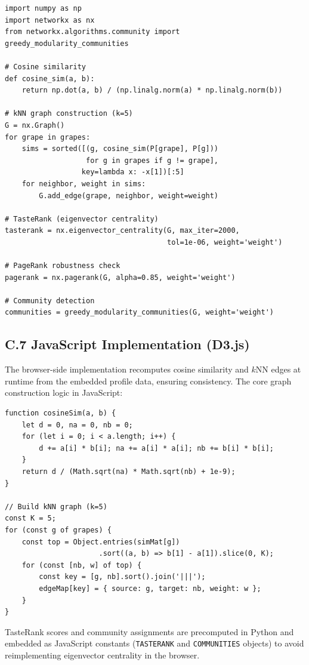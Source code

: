 \documentclass[11pt]{article}
\begin{document}
\begin{verbatim}
import numpy as np
import networkx as nx
from networkx.algorithms.community import greedy_modularity_communities

# Cosine similarity
def cosine_sim(a, b):
    return np.dot(a, b) / (np.linalg.norm(a) * np.linalg.norm(b))

# kNN graph construction (k=5)
G = nx.Graph()
for grape in grapes:
    sims = sorted([(g, cosine_sim(P[grape], P[g]))
                   for g in grapes if g != grape],
                  key=lambda x: -x[1])[:5]
    for neighbor, weight in sims:
        G.add_edge(grape, neighbor, weight=weight)

# TasteRank (eigenvector centrality)
tasterank = nx.eigenvector_centrality(G, max_iter=2000,
                                      tol=1e-06, weight='weight')

# PageRank robustness check
pagerank = nx.pagerank(G, alpha=0.85, weight='weight')

# Community detection
communities = greedy_modularity_communities(G, weight='weight')
\end{verbatim}

\subsection*{C.7 JavaScript Implementation (D3.js)}
The browser-side implementation recomputes cosine similarity and $k$NN edges at runtime from the embedded profile data, ensuring consistency. The core graph construction logic in JavaScript:

\begin{verbatim}
function cosineSim(a, b) {
    let d = 0, na = 0, nb = 0;
    for (let i = 0; i < a.length; i++) {
        d += a[i] * b[i]; na += a[i] * a[i]; nb += b[i] * b[i];
    }
    return d / (Math.sqrt(na) * Math.sqrt(nb) + 1e-9);
}

// Build kNN graph (k=5)
const K = 5;
for (const g of grapes) {
    const top = Object.entries(simMat[g])
                      .sort((a, b) => b[1] - a[1]).slice(0, K);
    for (const [nb, w] of top) {
        const key = [g, nb].sort().join('|||');
        edgeMap[key] = { source: g, target: nb, weight: w };
    }
}
\end{verbatim}

TasteRank scores and community assignments are precomputed in Python and embedded as JavaScript constants (\texttt{TASTERANK} and \texttt{COMMUNITIES} objects) to avoid reimplementing eigenvector centrality in the browser.
\end{document}
